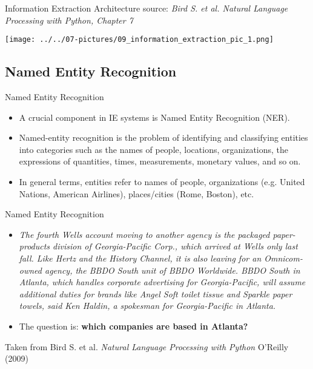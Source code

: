 \documentclass[11pt]{beamer}
\begin{document}
\begin{frame}{Information Extraction Architecture}
	\footnotesize{source: \textit{Bird S. et al. Natural Language Processing with Python, Chapter 7}}
	\begin{center}
	\texttt{[image: ../../07-pictures/09\_information\_extraction\_pic\_1.png]}
	\end{center}
\end{frame}
\subsection{Named Entity Recognition \\ \scalebox{0.8}{}}
\begin{frame}{Named Entity Recognition}
	\begin{itemize}
		\item A crucial component in IE systems is Named Entity Recognition (NER). 
		\item Named-entity recognition is the problem of identifying and classifying entities into categories such as the names of people, locations, organizations, the expressions of quantities, times, measurements, monetary values, and so on. 
		\item In general terms, entities refer to names of people, organizations (e.g. United Nations, American Airlines), places/cities (Rome, Boston), etc.
	\end{itemize}
\end{frame}
\begin{frame}{Named Entity Recognition}
	\begin{itemize}
		\item \textit{The fourth Wells account moving to another agency is the packaged paper-products division of Georgia-Pacific Corp., which arrived at Wells only last fall. Like Hertz and the History Channel, it is also leaving for an Omnicom-owned agency, the BBDO South unit of BBDO Worldwide. BBDO South in Atlanta, which handles corporate advertising for Georgia-Pacific, will assume additional duties for brands like Angel Soft toilet tissue and Sparkle paper towels, said Ken Haldin, a spokesman for Georgia-Pacific in Atlanta.}
		\item The question is: \textbf{which companies are based in Atlanta?}
	\end{itemize}
	Taken from Bird S. et al. \textit{Natural Language Processing with Python} O'Reilly (2009)
\end{frame}
\end{document}
